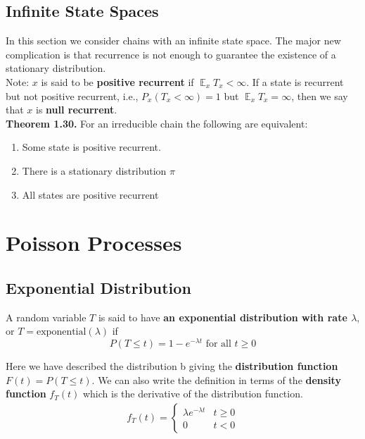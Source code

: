 \documentclass[12pt]{article}
\DeclareMathOperator*{\E}{\mathbb{E}}
\begin{document}

\subsection{Infinite State Spaces}

In this section we consider chains with an infinite state space. The major new complication is that recurrence is not enough to guarantee the existence of a stationary distribution.\\

Note: $x$ is said to be \textbf{positive recurrent} if $\E_xT_x < \infty$. If a state is recurrent but not positive recurrent, i.e., $P_x(T_x < \infty) = 1$ but $\E_xT_x = \infty$, then we say that $x$ is \textbf{null recurrent}.\\

\textbf{Theorem 1.30.} For an irreducible chain the following are equivalent:
\begin{enumerate}
\item Some state is positive recurrent.
\item There is a stationary distribution $\pi$
\item All states are positive recurrent
\end{enumerate} 

\newpage

\section{Poisson Processes}

\subsection{Exponential Distribution}

A random variable $T$ is said to have \textbf{an exponential distribution with rate $\lambda$}, or $T = \text{exponential}(\lambda)$ if $$P(T \leq t) = 1 - e^{-\lambda t} \text{  for all } t \geq 0$$

Here we have described the distribution b giving the \textbf{distribution function} $F(t) = P(T \leq t)$. We can also write the definition in terms of the \textbf{density function} $f_T(t)$ which is the derivative of the distribution function.
\begin{align*}
f_T(t) = \begin{cases} 
      \lambda e^{-\lambda t} & t \geq 0 \\
      0 & t < 0
   \end{cases}
\end{align*}
\end{document}
